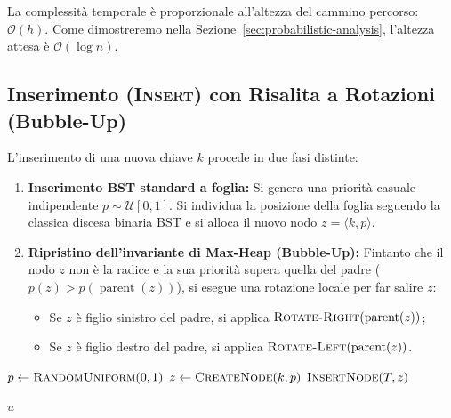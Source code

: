 La complessit\`a temporale \`e proporzionale all'altezza del cammino percorso: $\mathcal{O}(h)$. Come dimostreremo nella Sezione~\ref{sec:probabilistic-analysis}, l'altezza attesa \`e $\mathcal{O}(\log n)$.

\subsection{Inserimento (\textsc{Insert}) con Risalita a Rotazioni (Bubble-Up)}
L'inserimento di una nuova chiave $k$ procede in due fasi distinte:
\begin{enumerate}
    \item \textbf{Inserimento BST standard a foglia:} Si genera una priorit\`a casuale indipendente $p \sim \mathcal{U}[0, 1]$. Si individua la posizione della foglia seguendo la classica discesa binaria BST e si alloca il nuovo nodo $z = \langle k, p \rangle$.
    \item \textbf{Ripristino dell'invariante di Max-Heap (Bubble-Up):} Fintanto che il nodo $z$ non \`e la radice e la sua priorit\`a supera quella del padre ($p(z) > p(\operatorname{parent}(z))$), si esegue una rotazione locale per far salire $z$:
    \begin{itemize}
        \item Se $z$ \`e figlio sinistro del padre, si applica $\textsc{Rotate-Right}(\operatorname{parent}(z))$;
        \item Se $z$ \`e figlio destro del padre, si applica $\textsc{Rotate-Left}(\operatorname{parent}(z))$.
    \end{itemize}
\end{enumerate}

\begin{algorithm}[H]
\caption{Inserimento di una nuova coppia nel Treap ($\textsc{Insert}(T, k)$)}
\label{alg:treap-insert}
\BlankLine
$p \leftarrow \textsc{RandomUniform}(0, 1)$\;
$z \leftarrow \textsc{CreateNode}(k, p)$\;
\Return $\textsc{InsertNode}(T, z)$\;
\end{algorithm}

\begin{algorithm}[H]
\caption{Inserimento ricorsivo con rotazioni di risalita ($\textsc{InsertNode}(u, z)$)}
\label{alg:treap-insert-node}
\BlankLine
{}
\Return $u$\;
\end{algorithm}

